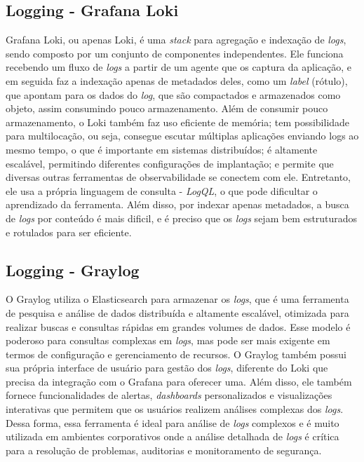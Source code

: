 \subsection{Logging - Grafana Loki}
Grafana Loki, ou apenas Loki, é uma \emph{stack} para agregação e indexação de \emph{logs}, sendo composto por um conjunto de componentes independentes. Ele funciona recebendo um fluxo de \emph{logs} a partir de um agente que os captura da aplicação, e em seguida faz a indexação apenas de metadados deles, como um \emph{label} (rótulo), que apontam para os dados do \emph{log}, que são compactados e armazenados como objeto, assim consumindo pouco armazenamento. Além de consumir pouco armazenamento, o Loki também faz uso eficiente de memória; tem possibilidade para multilocação, ou seja, consegue escutar múltiplas aplicações enviando logs ao mesmo tempo, o que é importante em sistemas distribuídos; é altamente escalável, permitindo diferentes configurações de implantação; e permite que diversas outras ferramentas de observabilidade se conectem com ele. Entretanto, ele usa a própria linguagem de consulta - \emph{LogQL}, o que pode dificultar o aprendizado da ferramenta. Além disso, por indexar apenas metadados, a busca de \emph{logs} por conteúdo é mais dificil, e é preciso que os \emph{logs} sejam bem estruturados e rotulados para ser eficiente. \cite{grafana-loki}

\subsection{Logging - Graylog}
O Graylog utiliza o Elasticsearch para armazenar os \emph{logs}, que é uma ferramenta de pesquisa e análise de dados distribuída e altamente escalável, otimizada para realizar buscas e consultas rápidas em grandes volumes de dados. Esse modelo é poderoso para consultas complexas em \emph{logs}, mas pode ser mais exigente em termos de configuração e gerenciamento de recursos. O Graylog também possui sua própria interface de usuário para gestão dos \emph{logs}, diferente do Loki que precisa da integração com o Grafana para oferecer uma. Além disso, ele também fornece funcionalidades de alertas, \emph{dashboards} personalizados e visualizações interativas que permitem que os usuários realizem análises complexas dos \emph{logs}. Dessa forma, essa ferramenta é ideal para análise de \emph{logs} complexos e é muito utilizada em ambientes corporativos onde a análise detalhada de \emph{logs} é crítica para a resolução de problemas, auditorias e monitoramento de segurança. \cite{graylog}

